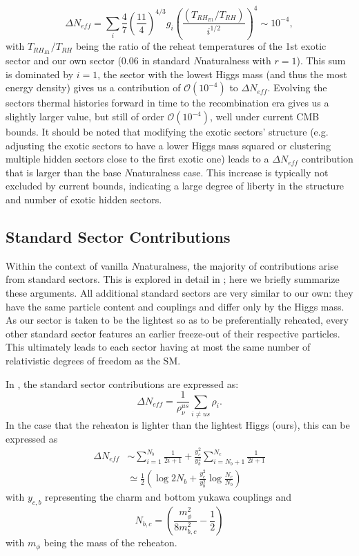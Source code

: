\documentclass[nofootinbib,twocolumn,preprintnumbers]{revtex4-1}
\begin{document}
\begin{equation}
\Delta N_{eff} = \sum_i \frac{4}{7}\left(\frac{11}{4}\right)^{4/3}g_{i} \left(\frac{(T_{RH_{E1}}/T_{RH})}{i^{1/2}}\right)^4 \sim 10^{-4},
\end{equation}     
with $T_{RH_{E1}}/T_{RH}$ being the ratio of the reheat temperatures of the 1st exotic sector and our own sector ($0.06$ in standard $N$naturalness with $r = 1$).  This sum is dominated by $i=1$, the sector with the lowest Higgs mass (and thus the most energy density) gives us a contribution of $\mathcal{O} (10^{-4})$ to $\Delta N_{eff}$. Evolving the sectors thermal histories forward in time to the recombination era gives us a slightly larger value, but still of order $\mathcal{O}(10^{-4})$, well under current CMB bounds. 
It should be noted that modifying the exotic sectors' structure (e.g. adjusting the exotic sectors to have a lower Higgs mass squared or clustering multiple hidden sectors close to the first exotic one) leads to a $\Delta N_{eff}$ contribution that is larger than the base $N$naturalness case. This increase is typically not excluded by current bounds, indicating a large degree of liberty in the structure and number of exotic hidden sectors.

\subsection{Standard Sector Contributions}

Within the context of vanilla $N$naturalness, the majority of contributions arise from standard sectors. This is explored in detail in \cite{Arkani-Hamed:2016rle}; here we briefly summarize these arguments. All additional standard sectors are very similar to our own: they have the same particle content and couplings and differ only by the Higgs mass. As our sector is taken to be the lightest so as to be preferentially reheated, every other standard sector features an earlier freeze-out of their respective particles. This ultimately leads to each sector having at most the same number of relativistic degrees of freedom as the SM.

In \cite{Arkani-Hamed:2016rle}, the standard sector contributions are expressed as:
\begin{equation}
\Delta N_{eff} = \frac{1}{\rho^{us}_\nu} \sum_{i\neq us} \rho_i.
\end{equation}
In the case that the reheaton is lighter than the lightest Higgs (ours), this can be expressed as
\begin{equation}
\begin{split}
\Delta N_{eff} &\sim \sum^{N_b}_{i=1}\frac{1}{2i+1}+\frac{y_c^2}{y_b^2}\sum^{N_c}_{i=N_b + 1}\frac{1}{2i+1}\\
& \simeq \frac{1}{2}\left(\log 2N_b + \frac{y_c^2}{y_b^2}\log \frac{N_c}{N_b}\right)
\end{split}
\end{equation}
with $y_{c,b}$ representing the charm and bottom yukawa couplings and 
\begin{equation}
N_{b,c} = \left(\frac{m_\phi^2}{8m^2_{b,c}}-\frac{1}{2}\right)
\end{equation}
with $m_\phi$ being the mass of the reheaton.
\end{document}
